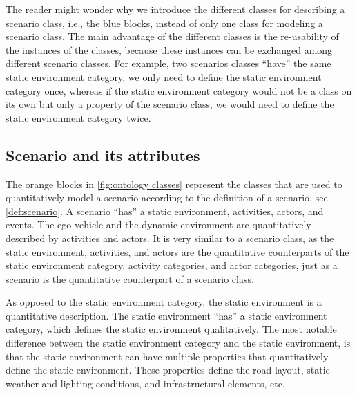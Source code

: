 \cbstartc
The reader might wonder why we introduce the different classes for describing a scenario class, i.e., the blue blocks, instead of only one class for modeling a scenario class. 
The main advantage of the different classes is the re-usability of the instances of the classes, because these instances can be exchanged among different scenario classes. For example, two scenarios classes ``have'' the same static environment category, we only need to define the static environment category once, whereas if the static environment category would not be a class on its own but only a property of the scenario class, we would need to define the static environment category twice.
\cbend


\subsection{Scenario and its attributes}
\label{sec:domain scenario}

The orange blocks in \cref{fig:ontology classes} represent the classes that are used to quantitatively model a scenario according to the definition of a scenario, see \cref{def:scenario}. A scenario ``has'' a static environment, activities, actors, and events. 
\cbstartb
The ego vehicle and the dynamic environment are quantitatively described by activities and actors. 
\cbend
It is very similar to a scenario class, as the static environment, activities, and actors are the quantitative counterparts of the static environment category, activity categories, and actor categories, just as a scenario is the quantitative counterpart of a scenario class. 

\cbstartc
As opposed to the static environment category, the static environment is a quantitative description.
\cbend
The static environment ``has'' a static environment category, which defines the static environment qualitatively. The most notable difference between the static environment category and the static environment, is that the static environment can have multiple properties that quantitatively define the static environment. These properties define the road layout, static weather and lighting conditions, and infrastructural elements, etc.

